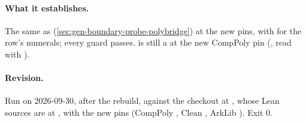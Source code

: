 \paragraph{What it establishes.} The same as 
(\cref{sec:gen-boundary-probe-polybridge}) at the new pins, with  for the row's
numerals; every guard passes.  is still a  at the new
CompPoly pin  (, read with ).

\paragraph{Revision.} Run on 2026-09-30, after the rebuild, against the checkout  at , whose Lean sources are  at , with the new pins (CompPoly , Clean , ArkLib ). Exit 0.

